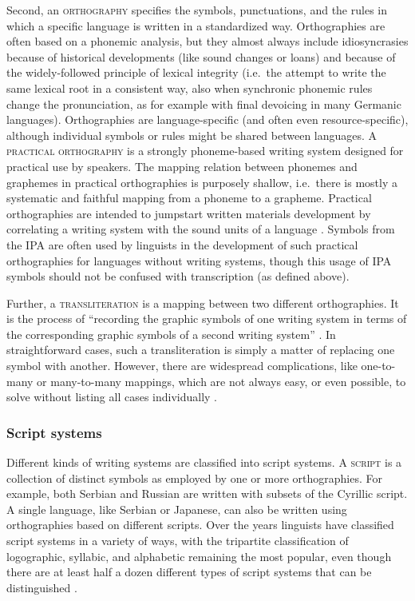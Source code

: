 Second, an \textsc{orthography} specifies the symbols, punctuations, and the
rules in which a specific language is written in a standardized way.
Orthographies are often based on a phonemic analysis, but they almost always
include idiosyncrasies because of historical developments (like sound changes or
loans) and because of the widely-followed principle of lexical integrity
(i.e.~the attempt to write the same lexical root in a consistent way, also when
synchronic phonemic rules change the pronunciation, as for example with final
devoicing in many Germanic languages). Orthographies are language-specific
(and often even resource-specific), although individual symbols or rules might
be shared between languages. A \textsc{practical orthography} is a strongly
phoneme-based writing system designed for practical use by speakers. The mapping
relation between phonemes and graphemes in practical orthographies is purposely
shallow, i.e.~there is mostly a systematic and faithful mapping from a phoneme
to a grapheme. Practical orthographies are intended to jumpstart written
materials development by correlating a writing system with the sound units of a
language \citep{MeinhofJones1928}. Symbols from the IPA are often used
by linguists in the development of such practical orthographies for languages
without writing systems, though this usage of IPA symbols should not be confused
with transcription (as defined above). 

Further, a \textsc{transliteration} is a mapping between two different
orthographies. It is the process of ``recording the graphic symbols of one
writing system in terms of the corresponding graphic symbols of a second writing
system'' \citep[396]{Kemp2006}. In straightforward cases, such a transliteration
is simply a matter of replacing one symbol with another. However, there are
widespread complications, like one-to-many or many-to-many mappings, which are
not always easy, or even possible, to solve without listing all cases
individually \citep[cf.~][Ch.~2]{Moran2012}.

\subsubsection*{Script systems}

Different kinds of writing systems are classified into script
systems. A \textsc{script} is a collection of distinct symbols as
employed by one or more orthographies. For example, both Serbian and Russian are
written with subsets of the Cyrillic script. A single language, like Serbian or
Japanese, can also be written using orthographies based on different scripts.
Over the years linguists have classified script systems in a variety of ways,
with the tripartite classification of logographic, syllabic, and alphabetic
remaining the most popular, even though there are at least half a dozen
different types of script systems that can be distinguished
\citep{Daniels1990,Daniels1996}.

